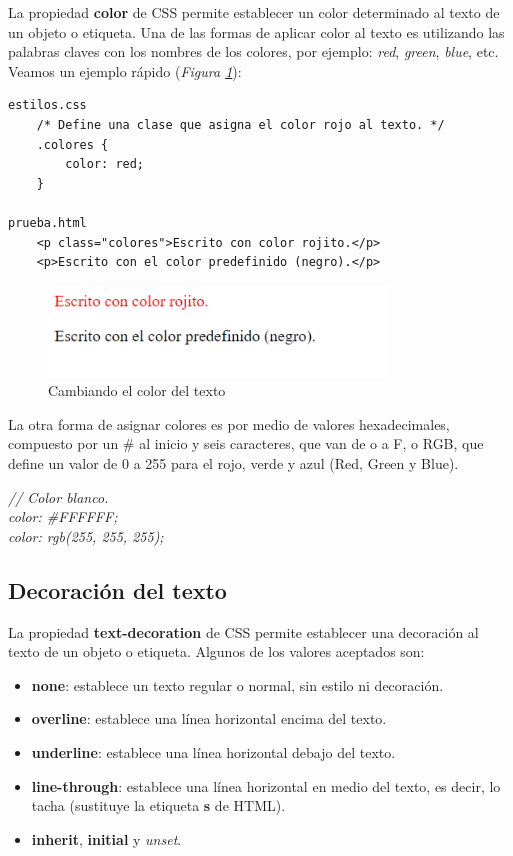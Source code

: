 La propiedad \textbf{color} de CSS permite establecer un color determinado al texto de un objeto o etiqueta. Una de las formas de aplicar color al texto es utilizando las palabras claves con los nombres de los colores, por ejemplo: \textit{red}, \textit{green}, \textit{blue}, etc. Veamos un ejemplo rápido (\textit{Figura \ref{fig: 11}}):
\begin{lstlisting}
estilos.css
    /* Define una clase que asigna el color rojo al texto. */
    .colores {
        color: red;
    }

prueba.html
    <p class="colores">Escrito con color rojito.</p>
    <p>Escrito con el color predefinido (negro).</p>
\end{lstlisting}
\begin{figure}[H]
    \centering
    \caption{Cambiando el color del texto}
    \label{fig: 11}
    \includegraphics[width=9cm]{ss/fuentes-color.png}
\end{figure}

La otra forma de asignar colores es por medio de valores hexadecimales, compuesto por un \# al inicio y seis caracteres, que van de o a F, o RGB, que define un valor de 0 a 255 para el rojo, verde y azul (Red, Green y Blue).
\begin{center}
    \textit{
        // Color blanco. \\
        color: \#FFFFFF; \\
        color: rgb(255, 255, 255); \\
    }
\end{center}


\subsection{Decoración del texto}

La propiedad \textbf{text-decoration} de CSS permite establecer una decoración al texto de un objeto o etiqueta. Algunos de los valores aceptados son:
\begin{itemize}
    \item \textbf{none}: establece un texto regular o normal, sin estilo ni decoración.
    \item \textbf{overline}: establece una línea horizontal encima del texto.
    \item \textbf{underline}: establece una línea horizontal debajo del texto.
    \item \textbf{line-through}: establece una línea horizontal en medio del texto, es decir, lo tacha (sustituye la etiqueta \textbf{s} de HTML).
    \item \textbf{inherit}, \textbf{initial} y \textit{unset}.
\end{itemize}

